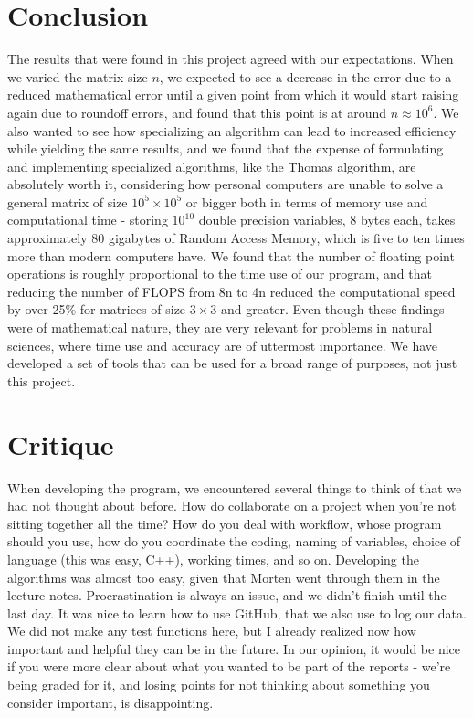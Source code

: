 \documentclass[10pt,a4paper]{article}
\begin{document}
\section{Conclusion}
The results that were found in this project agreed with our expectations. When we varied the matrix size $n$, we expected to see a decrease in the error due to a reduced mathematical error until a given point from which it would start raising again due to roundoff errors, and found that this point is at around $n \approx 10^6$. We also wanted to see how specializing an algorithm can lead to increased efficiency while yielding the same results, and we found that the expense of formulating and implementing specialized algorithms, like the Thomas algorithm, are absolutely worth it, considering how personal computers are unable to solve a general matrix of size $10^5\times10^5$ or bigger both in terms of memory use and computational time - storing $10^{10}
$ double precision variables, 8 bytes each, takes approximately 80 gigabytes of Random Access Memory, which is five to ten times more than modern computers have. We found that the number of floating point operations is roughly proportional to the time use of our program, and that reducing the number of FLOPS from 8n to 4n reduced the computational speed by over 25\% for matrices of size $3\times 3$ and greater. Even though these findings were of mathematical nature, they are very relevant for problems in natural sciences, where time use and accuracy are of uttermost importance. We have developed a set of tools that can be used for a broad range of purposes, not just this project.
\section{Critique}
When developing the program, we encountered several things to think of that we had not thought about before. How do collaborate on a project when you're not sitting together all the time? How do you deal with workflow, whose program should you use, how do you coordinate the coding, naming of variables, choice of language (this was easy, C++), working times, and so on. Developing the algorithms was almost too easy, given that Morten went through them in the lecture notes. Procrastination is always an issue, and we didn't finish until the last day. It was nice to learn how to use GitHub, that we also use to log our data. We did not make any test functions here, but I already realized now how important and helpful they can be in the future. In our opinion, it would be nice if you were more clear about what you wanted to be part of the reports - we're being graded for it, and losing points for not thinking about something you consider important, is disappointing.
\end{document}
